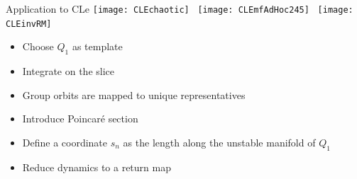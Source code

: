 \begin{frame}{Application to CLe}
 \centering
  \texttt{[image: CLEchaotic]}~
  \texttt{[image: CLEmfAdHoc245]}~
  \texttt{[image: CLEinvRM]}
  \begin{itemize}
    \item Choose $Q_1$ as template
    \item Integrate on the slice
    \item Group orbits are mapped to unique representatives
    \item Introduce Poincar\'e section
    \item Define a coordinate $s_n$ as the length along 
    the unstable manifold of $Q_1$ 
    \item Reduce dynamics to a return map
  \end{itemize}
\end{frame}


